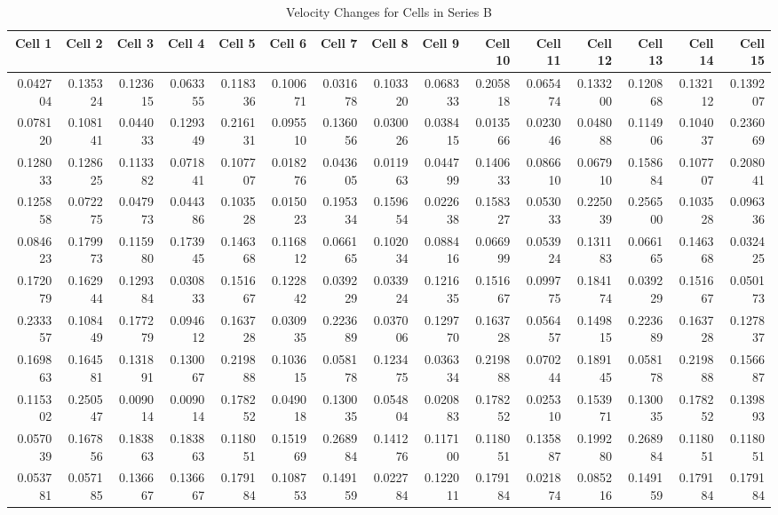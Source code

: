 \documentclass{article}
\begin{document}
\begin{landscape}
\begin{table}[htbp]
\centering
\caption{Velocity Changes for Cells in Series B }
\begin{tabular}{rrrrrrrrrrrrrrr}
\toprule
Cell 1 & Cell 2 & Cell 3 & Cell 4 & Cell 5 & Cell 6 & Cell 7 & Cell 8 & Cell 9 & Cell 10 & Cell 11 & Cell 12 & Cell 13 & Cell 14 & Cell 15 \\
\midrule
0.042704 & 0.135324 & 0.123615 & 0.063355 & 0.118336 & 0.100671 & 0.031678 & 0.103320 & 0.068333 & 0.205818 & 0.065474 & 0.133200 & 0.120868 & 0.132112 & 0.139207 \\
0.078120 & 0.108141 & 0.044033 & 0.129349 & 0.216131 & 0.095510 & 0.136056 & 0.030026 & 0.038415 & 0.013566 & 0.023046 & 0.048088 & 0.114906 & 0.104037 & 0.236069 \\
0.128033 & 0.128625 & 0.113382 & 0.071841 & 0.107707 & 0.018276 & 0.043605 & 0.011963 & 0.044799 & 0.140633 & 0.086610 & 0.067910 & 0.158684 & 0.107707 & 0.208041 \\
0.125858 & 0.072275 & 0.047973 & 0.044386 & 0.103528 & 0.015023 & 0.195334 & 0.159654 & 0.022638 & 0.158327 & 0.053033 & 0.225039 & 0.256500 & 0.103528 & 0.096336 \\
0.084623 & 0.179973 & 0.115980 & 0.173945 & 0.146368 & 0.116812 & 0.066165 & 0.102034 & 0.088416 & 0.066999 & 0.053924 & 0.131183 & 0.066165 & 0.146368 & 0.032425 \\
0.172079 & 0.162944 & 0.129384 & 0.030833 & 0.151667 & 0.122842 & 0.039229 & 0.033924 & 0.121635 & 0.151667 & 0.099775 & 0.184174 & 0.039229 & 0.151667 & 0.050173 \\
0.233357 & 0.108449 & 0.177279 & 0.094612 & 0.163728 & 0.030935 & 0.223689 & 0.037006 & 0.129770 & 0.163728 & 0.056457 & 0.149815 & 0.223689 & 0.163728 & 0.127837 \\
0.169863 & 0.164581 & 0.131891 & 0.130067 & 0.219888 & 0.103615 & 0.058178 & 0.123475 & 0.036334 & 0.219888 & 0.070244 & 0.189145 & 0.058178 & 0.219888 & 0.156687 \\
0.115302 & 0.250547 & 0.009014 & 0.009014 & 0.178252 & 0.049018 & 0.130035 & 0.054804 & 0.020883 & 0.178252 & 0.025310 & 0.153971 & 0.130035 & 0.178252 & 0.139893 \\
0.057039 & 0.167856 & 0.183863 & 0.183863 & 0.118051 & 0.151969 & 0.268984 & 0.141276 & 0.117100 & 0.118051 & 0.135887 & 0.199280 & 0.268984 & 0.118051 & 0.118051 \\
0.053781 & 0.057185 & 0.136667 & 0.136667 & 0.179184 & 0.108753 & 0.149159 & 0.022784 & 0.122011 & 0.179184 & 0.021874 & 0.085216 & 0.149159 & 0.179184 & 0.179184 \\

\end{tabular}
\end{table}
\end{landscape}
\end{document}
